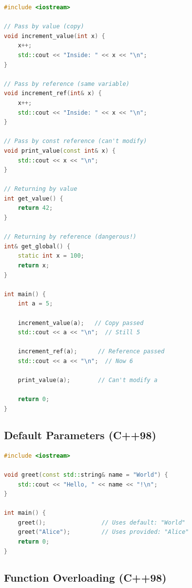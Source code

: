 \begin{lstlisting}[language={C++}]
#include <iostream>

// Pass by value (copy)
void increment_value(int x) {
    x++;
    std::cout << "Inside: " << x << "\n";
}

// Pass by reference (same variable)
void increment_ref(int& x) {
    x++;
    std::cout << "Inside: " << x << "\n";
}

// Pass by const reference (can't modify)
void print_value(const int& x) {
    std::cout << x << "\n";
}

// Returning by value
int get_value() {
    return 42;
}

// Returning by reference (dangerous!)
int& get_global() {
    static int x = 100;
    return x;
}

int main() {
    int a = 5;
    
    increment_value(a);   // Copy passed
    std::cout << a << "\n";  // Still 5
    
    increment_ref(a);      // Reference passed
    std::cout << a << "\n";  // Now 6
    
    print_value(a);        // Can't modify a
    
    return 0;
}
\end{lstlisting}

\hypertarget{default-parameters-c98}{%
\subsection{Default Parameters (C++98)}\label{default-parameters-c98}}

\begin{lstlisting}[language={C++}]
#include <iostream>

void greet(const std::string& name = "World") {
    std::cout << "Hello, " << name << "!\n";
}

int main() {
    greet();                // Uses default: "World"
    greet("Alice");         // Uses provided: "Alice"
    return 0;
}
\end{lstlisting}

\hypertarget{function-overloading-c98}{%
\subsection{Function Overloading
(C++98)}\label{function-overloading-c98}}

